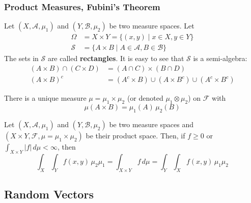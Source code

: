   \subsubsection{Product Measures, Fubini's Theorem}

    Let $(X, \mathcal{A}, \mu_1)$ and $(Y, \mathcal{B}, \mu_2)$ be two measure spaces. Let 
    \begin{align*}
      \Omega & = X \times Y = \{(x, y) \mid x \in X, y \in Y\} \\
      \mathcal{S} & = \{A \times B \mid A \in \mathcal{A}, B \in \mathcal{B}\}
    \end{align*}
    The sets in $\mathcal{S}$ are called \textbf{rectangles}. It is easy to see that $\mathcal{S}$ is a semi-algebra: 
    \begin{align*}
      (A \times B) \cap (C \times D) & = (A \cap C) \times (B \cap D) \\
      (A \times B)^c & = (A^c \times B) \cup (A \times B^c) \cup (A^c \times B^c) 
    \end{align*}

    \begin{theorem}
      There is a unique measure $\mu = \mu_1 \times \mu_2$ (or denoted $\mu_1 \otimes \mu_2$) on $\mathcal{F}$ with 
      \begin{equation}
        \mu(A \times B) = \mu_1 (A) \, \mu_2 (B)
      \end{equation}
    \end{theorem}

    \begin{theorem}
      Let $(X, \mathcal{A}, \mu_1)$ and $(Y, \mathcal{B}, \mu_2)$ be two measure spaces and $(X \times Y, \mathcal{F}, \mu = \mu_1 \times \mu_2)$ be their product space. Then, if $f \geq 0$ or $\int_{X \times Y} |f| \,d\mu < \infty$, then 
      \begin{equation}
        \int_X \int_Y f(x, y) \, \mu_2 \mu_1 = \int_{X \times Y} f \,d\mu = \int_Y \int_X f(x, y) \, \mu_1 \mu_2
      \end{equation}
    \end{theorem}

\subsection{Random Vectors}

